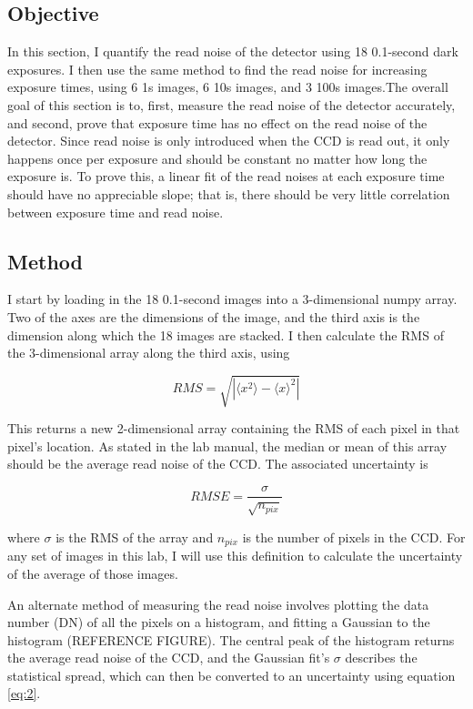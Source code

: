 \documentclass{aastex6}
\begin{document}
\subsection{Objective}
    In this section, I quantify the read noise of the detector using 18 0.1-second dark exposures. I then use the same method to find the read noise for increasing exposure times, using 6 1s images, 6 10s images, and 3 100s images.The overall goal of this section is to, first, measure the read noise of the detector accurately, and second, prove that exposure time has no effect on the read noise of the detector. Since read noise is only introduced when the CCD is read out, it only happens once per exposure and should be constant no matter how long the exposure is. To prove this, a linear fit of the read noises at each exposure time should have no appreciable slope; that is, there should be very little correlation between exposure time and read noise.

\subsection{Method}
    I start by loading in the 18 0.1-second images into a 3-dimensional numpy array. Two of the axes are the dimensions of the image, and the third axis is the dimension along which the 18 images are stacked. I then calculate the RMS of the 3-dimensional array along the third axis, using

\begin{equation}
    RMS = \sqrt{|\langle x^2 \rangle-\langle x \rangle^2|}\label{eq:1}
\end{equation}

    This returns a new 2-dimensional array containing the RMS of each pixel in that pixel's location. As stated in the lab manual, the median or mean of this array should be the average read noise of the CCD. The associated uncertainty is

\begin{equation}
    RMSE = \frac{\sigma}{\sqrt{n_{pix}}}\label{eq:2}
\end{equation}

    where $ \sigma $ is the RMS of the array and $ n_{pix} $ is the number of pixels in the CCD. For any set of images in this lab, I will use this definition to calculate the uncertainty of the average of those images.
\par
    An alternate method of measuring the read noise involves plotting the data number (DN) of all the pixels on a histogram, and fitting a Gaussian to the histogram (REFERENCE FIGURE). The central peak of the histogram returns the average read noise of the CCD, and the Gaussian fit's $ \sigma $ describes the statistical spread, which can then be converted to an uncertainty using equation \ref{eq:2}.
\end{document}
